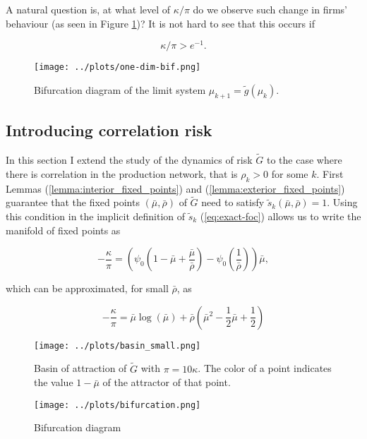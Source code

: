 \documentclass[../../main.tex]{subfiles}
\begin{document}
A natural question is, at what level of $\kappa / \pi$ do we observe such change in firms' behaviour (as seen in Figure \ref{fig:one-dimensional-bifurcation})? It is not hard to see that this occurs if 

\begin{equation}
  \kappa / \pi > e^{-1}.
\end{equation}


\begin{figure}[H]
  \centering
  \texttt{[image: ../plots/one-dim-bif.png]}
  \caption{Bifurcation diagram of the limit system $\mu_{k + 1} = \tilde{g}(\mu_k)$.}
  \label{fig:one-dimensional-bifurcation}
\end{figure}

\subsection{Introducing correlation risk}

In this section I extend the study of the dynamics of risk $\tilde{G}$ to the case where there is correlation in the production network, that is $\rho_k > 0$ for some $k$. First Lemmas (\ref{lemma:interior_fixed_points}) and (\ref{lemma:exterior_fixed_points}) guarantee that the fixed points $(\bar{\mu}, \bar{\rho})$ of $\tilde{G}$ need to satisfy $\tilde{s}_k(\bar{\mu}, \bar{\rho})= 1$. Using this condition in the implicit definition of $\tilde{s}_k$ (\ref{eq:exact-foc}) allows us to write the manifold of fixed points as

\begin{equation}
  -\frac{\kappa}{\pi} = \left( \psi_0\left(1 - \bar{\mu} + \frac{ \bar{\mu} }{\bar{\rho}} \right) - \psi_0\left(\frac{1}{\bar{\rho}} \right) \right) \bar{\mu},
\end{equation}

which can be approximated, for small $\bar{\rho}$, as

\begin{equation}
  -\frac{\kappa}{\pi} = \bar{\mu}\log(\bar{\mu}) + \bar{\rho} \left( \bar{\mu}^2 - \frac{1}{2} \bar{\mu} + \frac{1}{2} \right)
\end{equation}



\begin{figure}[H]
  \centering
  \texttt{[image: ../plots/basin\_small.png]}
  \caption{Basin of attraction of $\tilde{G}$ with $\pi = 10 \kappa$. The color of a point indicates the value $1 - \bar{\mu}$ of the attractor of that point.}
  \label{fig:two-dimensional:basin}
\end{figure}

\begin{figure}[H]
  \centering
  \texttt{[image: ../plots/bifurcation.png]}
  \caption{Bifurcation diagram }
  \label{fig:two-dimensional:bifurcation}
\end{figure}
\end{document}
